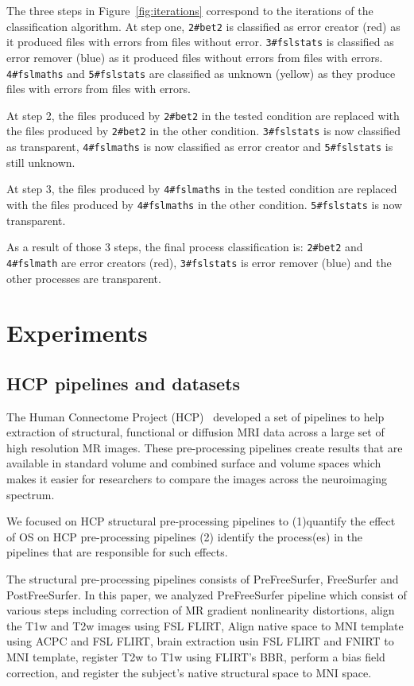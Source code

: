 \documentclass[a4paper,num-refs]{oup-contemporary}
\begin{document}
The three steps in Figure~\ref{fig:iterations} correspond to the 
iterations of the classification algorithm. At step one, \texttt{2\#bet2} 
is classified as error creator (red) as it produced files with errors 
from files without error. \texttt{3\#fslstats} is classified as error 
remover (blue) as it produced files without errors from files with 
errors. \texttt{4\#fslmaths} and \texttt{5\#fslstats} are classified as 
unknown (yellow) as they produce files with errors from files with 
errors.

At step 2, the files produced by \texttt{2\#bet2} in the tested 
condition are replaced with the files produced by \texttt{2\#bet2} in 
the other condition. \texttt{3\#fslstats} is now classified as 
transparent, \texttt{4\#fslmaths} is now classified as error creator 
and \texttt{5\#fslstats} is still unknown.

At step 3, the files produced by \texttt{4\#fslmaths} in the tested 
condition are replaced with the files produced by \texttt{4\#fslmaths} 
in the other condition. \texttt{5\#fslstats} is now transparent.
 
As a result of those 3 steps, the final process classification is: 
\texttt{2\#bet2} and \texttt{4\#fslmath} are error creators (red), 
\texttt{3\#fslstats} is error remover (blue) and the other processes 
are transparent.


\section{Experiments}

\subsection{HCP pipelines and datasets}

The Human Connectome Project (HCP)~\cite{glasser2013minimal} developed 
a set of pipelines to help extraction of structural, functional or 
diffusion MRI data across a large set of high resolution MR images. 
These pre-processing pipelines create results that are available in 
standard volume and combined surface and volume spaces which makes it 
easier for researchers to compare the images across the neuroimaging 
spectrum. 

We focused on HCP structural pre-processing pipelines to (1)quantify 
the effect of OS on HCP pre-processing pipelines (2) identify the 
process(es) in the pipelines that are responsible for such effects.

The structural pre-processing pipelines consists of PreFreeSurfer, 
FreeSurfer and PostFreeSurfer. In this paper, 
we analyzed PreFreeSurfer pipeline which consist of various steps 
including correction of MR 
gradient nonlinearity distortions, align the T1w and T2w images using 
FSL FLIRT, Align native space to MNI template using ACPC and FSL FLIRT, 
brain extraction usin FSL FLIRT and FNIRT to MNI template, register T2w 
to T1w using FLIRT's BBR, perform a bias field correction, and register 
the subject's native structural space to MNI space.  
\end{document}
